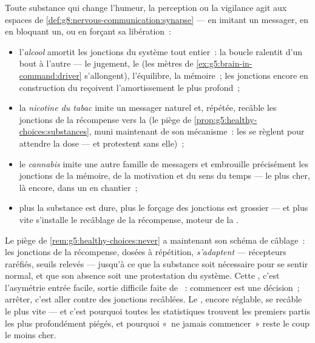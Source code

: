 \begin{proposition}\label{prop:g8:protecting-the-nervous-system:substances}
Toute substance qui change l'humeur, la perception ou la
vigilance agit aux espaces de
\cref{def:g8:nervous-communication:synapse} --- en imitant
un messager, en en bloquant un, ou en forçant sa
libération~:
\begin{itemize}
  \item l'\emph{alcool} amortit les jonctions du système
        tout entier~: la boucle ralentit d'un bout à
        l'autre --- le jugement, le  (les
        mètres de \cref{ex:g5:brain-in-command:driver}
        s'allongent), l'équilibre, la mémoire~; les
        jonctions encore en construction du 
         reçoivent l'amortissement le plus
        profond~;
  \item la \emph{nicotine du tabac} imite un messager
        naturel et, répétée, recâble les jonctions de la
        récompense vers la \emph{} (le piège de
        \cref{prop:g5:healthy-choices:substances}, muni
        maintenant de son mécanisme~: les  se
        règlent pour attendre la dose --- et protestent
        sans elle)~;
  \item le \emph{cannabis} imite une autre famille de
        messagers et embrouille précisément les jonctions
        de la mémoire, de la motivation et du sens du
        temps --- le plus cher, là encore, dans un 
        en chantier~;
  \item plus la substance est dure, plus le forçage des
        jonctions est grossier --- et plus vite s'installe
        le recâblage de la récompense, moteur de la
        .
\end{itemize}
\end{proposition}
\admitted

\begin{remark}\label{rem:g8:protecting-the-nervous-system:addiction}
Le piège de \cref{rem:g5:healthy-choices:never} a
maintenant son schéma de câblage~: les jonctions de la
récompense, dosées à répétition, \emph{s'adaptent} ---
récepteurs raréfiés, seuils relevés --- jusqu'à ce que la
substance soit nécessaire pour se sentir normal, et que son
absence soit une protestation du système. Cette ,
c'est l'asymétrie entrée facile, sortie difficile faite de
~: commencer est une décision~; arrêter, c'est aller
contre des jonctions recâblées. Le  ,
encore réglable, se recâble le plus vite --- et c'est
pourquoi toutes les statistiques trouvent les premiers
partis les plus profondément piégés, et pourquoi
«~ne jamais commencer~» reste le coup le moins cher.
\end{remark}

